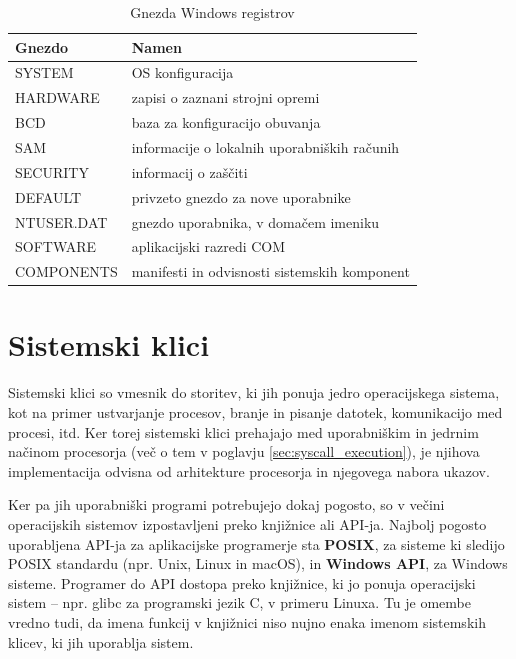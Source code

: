 \documentclass[a4paper,12pt,openright]{book}
\begin{document}
\begin{table}[h!]
	\begin{center}
		\begin{tabular}{ p{3.7cm}|p{8.8cm} }
			Gnezdo     & Namen                                         \\
			\hline
			SYSTEM     & OS konfiguracija                              \\
			HARDWARE   & zapisi o zaznani strojni opremi               \\
			BCD        & baza za konfiguracijo obuvanja                \\
			SAM        & informacije o lokalnih uporabniških računih \\
			SECURITY   & informacij o zaščiti                        \\
			DEFAULT    & privzeto gnezdo za nove uporabnike            \\
			NTUSER.DAT & gnezdo uporabnika, v domačem imeniku         \\
			SOFTWARE   & aplikacijski razredi COM                      \\
			COMPONENTS & manifesti in odvisnosti sistemskih komponent  \\
		\end{tabular}
	\end{center}
	\caption{Gnezda Windows registrov}
	\label{tab:windows_registry_hives}
\end{table}

\section{Sistemski klici}

Sistemski klici so vmesnik do storitev, ki jih ponuja jedro operacijskega sistema, kot na primer ustvarjanje procesov, branje in pisanje datotek, komunikacijo med procesi, itd.
Ker torej sistemski klici prehajajo med uporabniškim in jedrnim načinom procesorja (več o tem v poglavju \ref{sec:syscall_execution}), je njihova implementacija odvisna od arhitekture procesorja in njegovega nabora ukazov.

Ker pa jih uporabniški programi potrebujejo dokaj pogosto, so v večini operacijskih sistemov izpostavljeni preko knjižnice ali API-ja.
Najbolj pogosto uporabljena API-ja za aplikacijske programerje sta \textbf{POSIX}, za sisteme ki sledijo POSIX standardu (npr. Unix, Linux in macOS), in \textbf{Windows API}, za Windows sisteme.
Programer do API dostopa preko knjižnice, ki jo ponuja operacijski sistem -- npr. glibc za programski jezik C, v primeru Linuxa.
Tu je omembe vredno tudi, da imena funkcij v knjižnici niso nujno enaka imenom sistemskih klicev, ki jih uporablja sistem.
\end{document}
